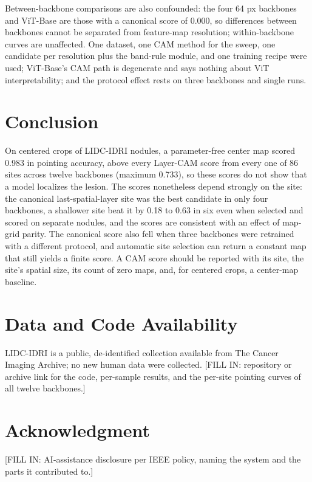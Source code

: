 \documentclass[conference]{IEEEtran}
\begin{document}
Between-backbone comparisons are also confounded: the four 64 px backbones and ViT-Base are those with a canonical score of 0.000, so differences between backbones cannot be separated from feature-map resolution; within-backbone curves are unaffected. One dataset, one CAM method for the sweep, one candidate per resolution plus the band-rule module, and one training recipe were used; ViT-Base's CAM path is degenerate and says nothing about ViT interpretability; and the protocol effect rests on three backbones and single runs.

\section{Conclusion}\label{sec:conclusion}
On centered crops of LIDC-IDRI nodules, a parameter-free center map scored 0.983 in pointing accuracy, above every Layer-CAM score from every one of 86 sites across twelve backbones (maximum 0.733), so these scores do not show that a model localizes the lesion. The scores nonetheless depend strongly on the site: the canonical last-spatial-layer site was the best candidate in only four backbones, a shallower site beat it by 0.18 to 0.63 in six even when selected and scored on separate nodules, and the scores are consistent with an effect of map-grid parity. The canonical score also fell when three backbones were retrained with a different protocol, and automatic site selection can return a constant map that still yields a finite score. A CAM score should be reported with its site, the site's spatial size, its count of zero maps, and, for centered crops, a center-map baseline.

\section*{Data and Code Availability}
LIDC-IDRI is a public, de-identified collection available from The Cancer Imaging Archive; no new human data were collected. [FILL IN: repository or archive link for the code, per-sample results, and the per-site pointing curves of all twelve backbones.]

\section*{Acknowledgment}
[FILL IN: AI-assistance disclosure per IEEE policy, naming the system and the parts it contributed to.]
\end{document}
